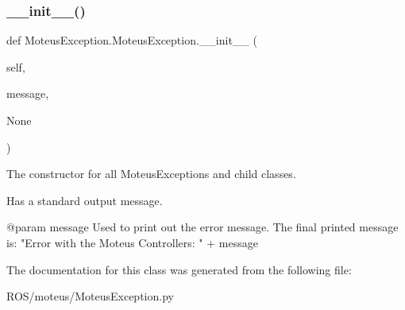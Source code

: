\subsubsection{\texorpdfstring{\+\_\+\+\_\+init\+\_\+\+\_\+()}{\_\_init\_\_()}}
{\footnotesize\ttfamily def Moteus\+Exception.\+Moteus\+Exception.\+\_\+\+\_\+init\+\_\+\+\_\+ (\begin{DoxyParamCaption}\item[{}]{self,  }\item[{}]{message,  }\item[{}]{None }\end{DoxyParamCaption})}



The constructor for all Moteus\+Exceptions and child classes. 

Has a standard output message. \begin{DoxyVerb}       @param  message  Used to print out the error message. The final printed message is: "Error with the Moteus Controllers: " + message\end{DoxyVerb}
 

The documentation for this class was generated from the following file\+:\begin{DoxyCompactItemize}
\item 
R\+O\+S/moteus/Moteus\+Exception.\+py\end{DoxyCompactItemize}
